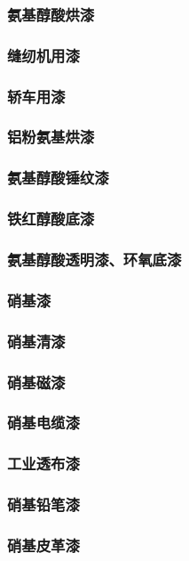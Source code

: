 \documentclass[UTF8]{../../ApplicationUniverse}
\begin{document}
    \subsubsection{氨基醇酸烘漆}
        \subsubsection{缝纫机用漆}
        \subsubsection{轿车用漆}
    \subsubsection{铝粉氨基烘漆}
    \subsubsection{氨基醇酸锤纹漆}
    \subsubsection{铁红醇酸底漆}
    \subsubsection{氨基醇酸透明漆、环氧底漆}
\subsubsection{硝基漆}
    \subsubsection{硝基清漆}
    \subsubsection{硝基磁漆}
    \subsubsection{硝基电缆漆}
    \subsubsection{工业透布漆}
    \subsubsection{硝基铅笔漆}
    \subsubsection{硝基皮革漆}
\end{document}
